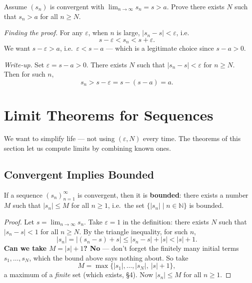 \documentclass[11pt]{report}
\begin{document}
\begin{exbox}
Assume $(s_n)$ is convergent with $\lim_{n\to\infty} s_n = s > a$. Prove there exists $N$ such that $s_n > a$ for all $n \geq N$.

\emph{Finding the proof.} For any $\varepsilon$, when $n$ is large, $|s_n - s| < \varepsilon$, i.e.
\[
s - \varepsilon < s_n < s + \varepsilon.
\]
We want $s - \varepsilon > a$, i.e.\ $\varepsilon < s - a$ --- which is a legitimate choice since $s - a > 0$.

\emph{Write-up.} Set $\varepsilon = s - a > 0$. There exists $N$ such that $|s_n - s| < \varepsilon$ for $n \geq N$. Then for such $n$,
\[
s_n > s - \varepsilon = s - (s - a) = a. \tag*{$\blacksquare$}
\]
\end{exbox}


\section{Limit Theorems for Sequences}

We want to simplify life --- not using $(\varepsilon, N)$ every time. The theorems of this section let us compute limits by combining known ones.

\subsection{Convergent Implies Bounded}

\begin{thmbox}
If a sequence $(s_n)_{n=1}^{\infty}$ is convergent, then it is \textbf{bounded}: there exists a number $M$ such that $|s_n| \leq M$ for all $n \geq 1$, i.e.\ the set $\{|s_n| \mid n \in \mathbb{N}\}$ is bounded.
\end{thmbox}

\begin{proof}
Let $s = \lim_{n\to\infty} s_n$. Take $\varepsilon = 1$ in the definition: there exists $N$ such that $|s_n - s| < 1$ for all $n \geq N$. By the triangle inequality, for such $n$,
\[
|s_n| = |(s_n - s) + s| \leq |s_n - s| + |s| < |s| + 1.
\]
\textbf{Can we take $M = |s| + 1$? No} --- don't forget the finitely many initial terms $s_1, \ldots, s_N$, which the bound above says nothing about. So take
\[
M = \max\{|s_1|, \ldots, |s_N|,\ |s| + 1\},
\]
a maximum of a \emph{finite} set (which exists, \S 4). Now $|s_n| \leq M$ for all $n \geq 1$.
\end{proof}
\end{document}
